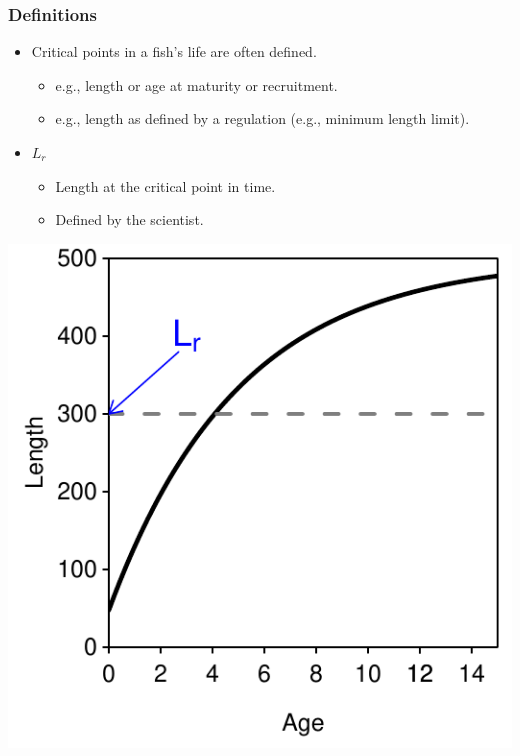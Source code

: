 \documentclass[xcolor=dvipsnames,t]{beamer}\usepackage[]{graphicx}\usepackage[]{color}
\newenvironment{knitrout}{}{} %
\begin{document}
\begin{frame}[fragile]
\frametitle{Definitions}
\begin{itemize}
  \item Critical points in a fish's life are often defined.
  \begin{itemize}
    \item e.g., length or age at maturity or recruitment.
    \item e.g., length as defined by a regulation (e.g., minimum length limit).
  \end{itemize}
\end{itemize}
\pause
\smallskip
\begin{minipage}[t]{0.6\textwidth}
  \begin{itemize}
    \item $L_{r}$
    \begin{itemize}
      \item Length at the critical point in time.
      \item Defined by the scientist.
    \end{itemize}
  \end{itemize}
\end{minipage}%
\hspace*{-2cm}
\begin{minipage}[t]{0.7\textwidth}
\begin{knitrout}\footnotesize
{}\color{fgcolor}

{\centering \includegraphics[width=.6\linewidth]{Figs/defn1-1} 

}



\end{knitrout}
\end{minipage}%
\end{frame}
\end{document}
